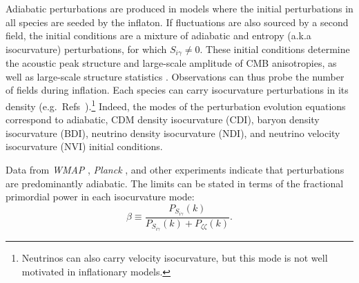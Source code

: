 Adiabatic perturbations are produced in models where the initial perturbations in all species are seeded by the inflaton. If fluctuations are also sourced by a second field, the initial conditions are a mixture of adiabatic and entropy (a.k.a isocurvature) perturbations, for which $S_{i\gamma}\neq 0$. These initial conditions determine the acoustic peak structure and large-scale amplitude of CMB anisotropies, as well as large-scale structure statistics \cite{Bond:1984fp,Kodama:1986fg,Kodama:1986ud,Hu:1994jd,Moodley:2004nz,Bean:2006qz}. Observations can thus probe the number of fields during inflation. 
\label{sec:isosec}
Each species can carry isocurvature perturbations in its density (e.g.\ Refs~\cite{Bucher:1999re,Bucher:2004an,Moodley:2004nz}).\footnote{Neutrinos can also carry velocity isocurvature, but this mode is not well motivated in inflationary models.} Indeed, the modes of the perturbation evolution equations correspond to adiabatic, CDM density isocurvature (CDI), baryon density isocurvature (BDI), neutrino density isocurvature (NDI), and neutrino velocity isocurvature (NVI) initial conditions. 


Data from {\it WMAP\/} \cite{Dunkley:2008ie}, \textit{Planck} \cite{Ade:2013uln,Ade:2015lrj}, and other experiments \cite{Enqvist:2000hp,MacTavish:2005yk} indicate that perturbations are predominantly adiabatic. The limits can be stated in terms of the fractional primordial power in each isocurvature mode:\begin{equation}
\beta\equiv \frac{P_{S_{i\gamma}}(k)}{P_{S_{i\gamma}}(k)+P_{\zeta\zeta}(k)}.
\end{equation}

